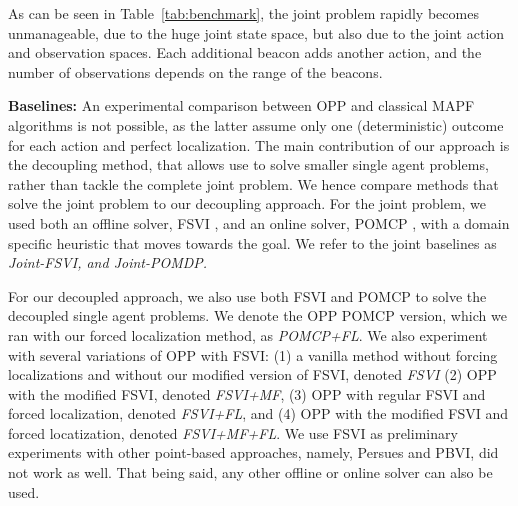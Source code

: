 \documentclass[letterpaper]{article} %
\newcommand{\guy}[1]{\textcolor{blue}{[Guy: #1]}}
\begin{document}
As can be seen in Table~\ref{tab:benchmark}, the joint problem rapidly becomes unmanageable, due to the huge joint state space, but also due to the joint action and observation spaces. Each additional beacon adds another action, and the number of observations depends on the range of the beacons.


\noindent\textbf{Baselines:} An experimental comparison between OPP and classical MAPF algorithms is not possible, as the latter assume only one (deterministic) outcome for each action and perfect localization.
The main contribution of our approach is the decoupling method, that allows use to solve smaller single agent problems, rather than tackle the complete joint problem. We hence compare methods that solve the joint problem to our decoupling approach. For the joint problem, we used both an offline solver, FSVI \cite{shani2013survey}, and an online solver, POMCP \cite{silver2010monte}, with a domain specific heuristic that moves towards the goal. We refer to the joint baselines as \em{Joint-FSVI}, and \em{Joint-POMDP}. %

For our decoupled approach, we also use both FSVI and POMCP to solve the decoupled single agent problems. We denote the OPP POMCP version, which we ran with our forced localization method, as \emph{POMCP+FL}.
We also experiment with several variations of OPP with FSVI: (1) a vanilla method without forcing localizations and without our modified version of FSVI, denoted \emph{FSVI} (2) OPP with the modified FSVI, denoted \emph{FSVI+MF},  (3) OPP with regular FSVI and forced localization, denoted \emph{FSVI+FL}, and (4) OPP with the modified FSVI and forced locatization, denoted \emph{FSVI+MF+FL}.
We use FSVI as preliminary experiments with other point-based approaches, namely, Persues and PBVI, did not work as well. That being said, any other offline or online solver can also be used.



\end{document}
